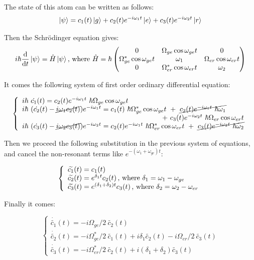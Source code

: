 \documentclass[%
]{scrreprt}
\newcommand{\ff}{\ensuremath{\ket{g}}\xspace}
\newcommand{\ee}{\ensuremath{\ket{e}}\xspace}
\newcommand{\rr}{\ensuremath{\ket{r}}\xspace}
\newcommand{\dd}{\ensuremath{\mathrm d}\xspace}
\newcommand{\om}{\omega}
\newcommand{\Om}{\Omega}
\begin{document}
\par The state of this atom can be written as follows: \[ \ket{\psi} = c_1(t) \ff + c_2(t) e^{-i \om_1 t} \ee + c_3(t) e^{-i \om_2 t} \rr \]

\par Then the Schrödinger equation gives: \[ i \hbar \frac{\dd}{\dd t} \ket{\psi} = \hat{H} \ket{\psi} \text{, where } \hat{H} = \hbar
\begin{pmatrix}
0 & \Om_{ge} \cos{\om_{ge} t} & 0 \\
\Om_{ge}^* \cos{\om_{ge} t} & \om_1 & \Om_{er} \cos{\om_{er} t}\\
0 & \Om_{er}^* \cos{\om_{er} t} & \om_2
\end{pmatrix}  \]

\par It comes the following system of first order ordinary differential equation:

\[ 
\left\{  \begin{array}{l}
i \hbar \ \dot{c_1}(t) =  c_2(t) e^{-i \om_1 t} \ \hbar \Om_{ge} \cos{\om_{ge} t}  \\
i \hbar \ ( \dot{c_2}(t) - \cancel{i \om_1 c_2(t)}) e^{-i \om_1 t}=  c_1(t) \ \hbar \Om_{ge}^* \cos{\om_{ge} t} \ + \ \cancel{c_2(t) e^{-i \om_1 t} \ \hbar \om_1} \\ \hfill + \ c_3(t)  e^{-i \om_2 t} \ \hbar \Om_{er} \cos{\om_{er} t} \\
i \hbar \ ( \dot{c_3}(t) - \cancel{i \om_2 c_3(t)}) e^{-i \om_2 t} =  c_2(t) e^{-i \om_1 t} \ \hbar \Om_{er}^* \cos{\om_{er} t} \ + \ \cancel{c_3(t) e^{-i \om_2 t} \ \hbar \om_2}
\end{array} \right.
\]

\par Then we proceed the following substitution in the previous system of equations, and cancel the non-resonant terms like $e^{-(\om_1 + \om_{ge})t}$:

\[
\left\{  \begin{array}{l}
\widetilde{c_1}(t) = c_1(t) \\
\widetilde{c_2}(t) = e^{\delta_1 t} c_2(t) \text{\,, where } \delta_1 = \om_1 - \om_{ge} \\
\widetilde{c_3}(t) = e^{(\delta_1 + \delta_2) t} c_3(t) \text{\,, where } \delta_2 = \om_2 - \om_{er}
\end{array} \right.
\]

\par Finally it comes:

\[
\left\{  \begin{array}{l}
\dot{\widetilde{c_1}}(t) = -i \Om_{ge}/2 \ \widetilde{c_2}(t) \\
\dot{\widetilde{c_2}}(t) = -i \Om_{ge}^*/2 \ \widetilde{c_1}(t) + i \delta_1 \widetilde{c_2}(t) - i \Om_{er}/2 \ \widetilde{c_3}(t) \\
\dot{\widetilde{c_3}}(t) = -i \Om_{er}^*/2 \ \widetilde{c_2}(t) + i(\delta_1 + \delta_2) \widetilde{c_3}(t)\end{array} \right.
\]
\end{document}
